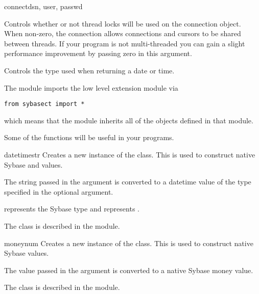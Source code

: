 \begin{funcdesc}{connect}{dsn, user, passwd \optional{, \ldots}}
\begin{description}
\item{}

Controls whether or not thread locks will be used on the connection
object.  When non-zero, the connection allows connections and cursors to be shared between threads.  If your program is not multi-threaded you can gain a slight performance improvement by passing zero in this argument.

\item{}

Controls the type used when returning a date or time.

\end{description}
\end{funcdesc}

The  module imports the low level 
extension module via

\begin{verbatim}
from sybasect import *
\end{verbatim}

which means that the  module inherits all of the
objects defined in that module.

Some of the functions will be useful in your programs.

\begin{funcdesc}{datetime}{str }
Creates a new instance of the  class.  This is used to
construct native Sybase  and  values.

The string passed in the  argument is converted to a datetime
value of the type specified in the optional  argument.

 represents the  Sybase
type and  represents
.

The  class is described in the 
module.
\end{funcdesc}

\begin{funcdesc}{money}{num}
Creates a new instance of the  class.  This is
used to construct native Sybase  values.

The value passed in the  argument is converted to a native
Sybase money value.

The  class is described in the 
module.
\end{funcdesc}

